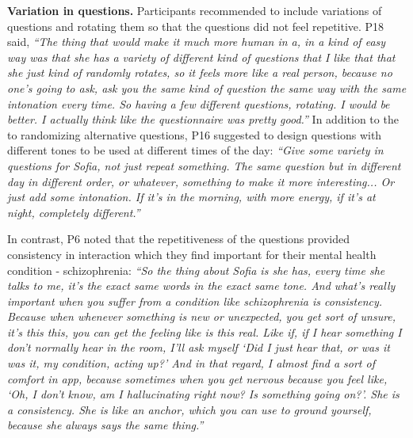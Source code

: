         \textbf{Variation in questions. }
        Participants recommended to include variations of questions and rotating them so that the questions did not feel repetitive. P18 said, 
        \textit{``The thing that would make it much more human in a, in a kind of easy way was that she has a variety of different kind of questions that I like that that she just kind of randomly rotates, so it feels more like a real person, because no one's going to ask, ask you the same kind of question the same way with the same intonation every time. So having a few different questions, rotating. I would be better. I actually think like the questionnaire was pretty good.''}
        In addition to the to randomizing alternative questions, P16 suggested to design questions with different tones to be used at different times of the day: 
        \textit{``Give some variety in questions for Sofia, not just repeat something. The same question but in different day in different order, or whatever, something to make it more interesting... Or just add some intonation. If it's in the morning, with more energy, if it's at night, completely different.'' }
        
        In contrast, P6 noted that the repetitiveness of the questions provided consistency in interaction which they find important for their mental health condition - schizophrenia:
        \textit{``So the thing about Sofia is she has, every time she talks to me, it's the exact same words in the exact same tone. And what's really important when you suffer from a condition like schizophrenia is consistency. Because when whenever something is new or unexpected, you get sort of unsure, it's this this, you can get the feeling like is this real. Like if, if I hear something I don't normally hear in the room, I'll ask myself `Did I just hear that, or was it was it, my condition, acting up?' And in that regard, I almost find a sort of comfort in \acl{app}, because sometimes when you get nervous because you feel like, `Oh, I don't know, am I hallucinating right now? Is something going on?'. She is a consistency. She is like an anchor, which you can use to ground yourself, because she always says the same thing.''}
        
        

